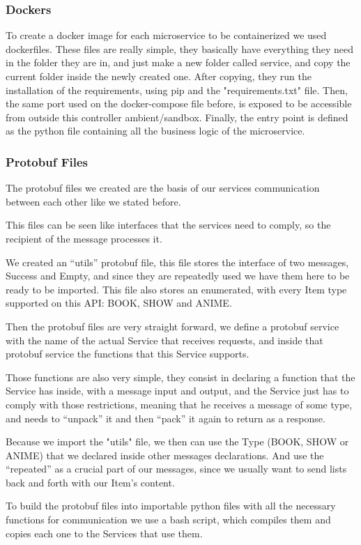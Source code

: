 \documentclass[oneside]{article}
\newcommand*\fpar{\hspace{1ex}}
\begin{document}
    \subsubsection{Dockers}
    \fpar To create a docker image for each microservice to be containerized we used dockerfiles. These files are really simple, they basically have everything they need in the folder they are in, and just make a new folder called service, and copy the current folder inside the newly created one. After copying, they run the installation of the requirements, using pip and the "requirements.txt" file. Then, the same port used on the docker-compose file before, is exposed to be accessible from outside this controller ambient/sandbox. Finally, the entry point is defined as the python file containing all the business logic of the microservice.

    \subsubsection{Protobuf Files}
    \fpar The protobuf files we created are the basis of our services communication between each other like we stated before.
    \par This files can be seen like interfaces that the services need to comply, so the recipient of the message processes it.
    \par We created an “utils” protobuf file, this file stores the interface of two messages, Success and Empty, and since they are repeatedly used we have them here to be ready to be imported. This file also stores an enumerated, with every Item type supported on this API: BOOK, SHOW and ANIME.
    \par Then the protobuf files are very straight forward, we define a protobuf service with the name of the actual Service that receives requests, and inside that protobuf service the functions that this Service supports.
    \par Those functions are also very simple, they consist in declaring a function that the Service has inside, with a message input and output, and the Service just has to comply with those restrictions, meaning that he receives a message of some type, and needs to “unpack” it and then “pack” it again to return as a response.
    \par Because we import the "utils" file, we then can use the Type (BOOK, SHOW or ANIME) that we declared inside other messages declarations. And use the “repeated” as a crucial part of our messages, since we usually want to send lists back and forth with our Item's content.
    \par To build the protobuf files into importable python files with all the necessary functions for communication we use a bash script, which compiles them and copies each one to the Services that use them.
      
\end{document}
